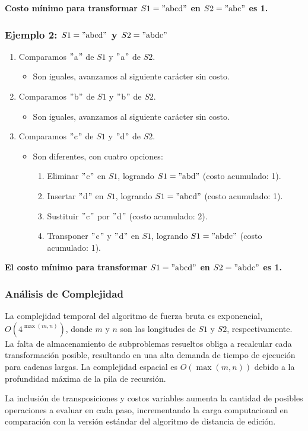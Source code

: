 \textbf{Costo mínimo para transformar $S1 = \text{$"$abcd$"$}$ en $S2 = \text{$"$abc$"$}$ es 1.}

\subsubsection{Ejemplo 2: $S1 = \text{$"$abcd$"$}$ y $S2 = \text{$"$abdc$"$}$}

\begin{enumerate}
    \item Comparamos $"$a$"$ de $S1$ y $"$a$"$ de $S2$.
    \begin{itemize}
        \item Son iguales, avanzamos al siguiente carácter sin costo.
    \end{itemize}
    \item Comparamos $"$b$"$ de $S1$ y $"$b$"$ de $S2$.
    \begin{itemize}
        \item Son iguales, avanzamos al siguiente carácter sin costo.
    \end{itemize}
    \item Comparamos $"$c$"$ de $S1$ y $"$d$"$ de $S2$.
    \begin{itemize}
        \item Son diferentes, con cuatro opciones:
        \begin{enumerate}
            \item Eliminar $"$c$"$ en $S1$, logrando $S1 = \text{$"$abd$"$}$ (costo acumulado: 1).
            \item Insertar $"$d$"$ en $S1$, logrando $S1 = \text{$"$abcd$"$}$ (costo acumulado: 1).
            \item Sustituir $"$c$"$ por $"$d$"$ (costo acumulado: 2).
            \item Transponer $"$c$"$ y $"$d$"$ en $S1$, logrando $S1 = \text{$"$abdc$"$}$ (costo acumulado: 1).
        \end{enumerate}
    \end{itemize}
\end{enumerate}

\textbf{El costo mínimo para transformar $S1 = \text{$"$abcd$"$}$ en $S2 = \text{$"$abdc$"$}$ es 1.}

\subsubsection{Análisis de Complejidad}
La complejidad temporal del algoritmo de fuerza bruta es exponencial, \( O(4^{\max(m, n)}) \), donde \( m \) y \( n \) son las longitudes de \( S1 \) y \( S2 \), respectivamente. La falta de almacenamiento de subproblemas resueltos obliga a recalcular cada transformación posible, resultando en una alta demanda de tiempo de ejecución para cadenas largas. La complejidad espacial es \( O(\max(m, n)) \) debido a la profundidad máxima de la pila de recursión.

La inclusión de transposiciones y costos variables aumenta la cantidad de posibles operaciones a evaluar en cada paso, incrementando la carga computacional en comparación con la versión estándar del algoritmo de distancia de edición.
